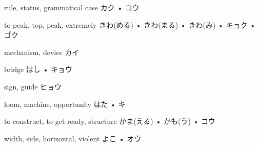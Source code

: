 



\setcounter{cardnum}{57}

		{rule, status, grammatical case}
		{カク • コウ}
		{}{}
		{}{}
		{}{}
		{}{}
		{}{}

		{to peak, top, peak, extremely}
		{きわ(める) • きわ(まる) • きわ(み) • キョク • ゴク}
		{}{}
		{}{}
		{}{}
		{}{}
		{}{}

		{mechanism, device}
		{カイ}
		{}{}
		{}{}
		{}{}
		{}{}
		{}{}

		{bridge}
		{はし • キョウ}
		{}{}
		{}{}
		{}{}
		{}{}
		{}{}

		{sign, guide}
		{ヒョウ}
		{}{}
		{}{}
		{}{}
		{}{}
		{}{}

		{loom, machine, opportunity}
		{はた • キ}
		{}{}
		{}{}
		{}{}
		{}{}
		{}{}

		{to construct, to get ready, structure}
		{かま(える) • かも(う) • コウ}
		{}{}
		{}{}
		{}{}
		{}{}
		{}{}

		{width, side, horizontal, violent}
		{よこ • オウ}
		{}{}
		{}{}
		{}{}
		{}{}
		{}{}


